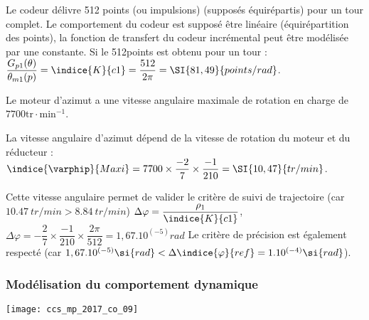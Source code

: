 \ifprof
\begin{corrige}
Le codeur délivre 512 points (ou impulsions) (supposés équirépartis) pour un tour complet. Le comportement du codeur est supposé être linéaire (équirépartition des points), la fonction de transfert du codeur incrémental peut être modélisée par une constante. Si le 512\ieme  points est obtenu pour un tour :
$\dfrac{G_{p1}  (\theta)}{\theta_{m1}  (p)}=\indice{K}{c1} =\dfrac{512}{2\pi} =\SI{81,49}{points/rad}$. 

\end{corrige}
\else
\fi

Le moteur d'azimut a une vitesse angulaire maximale de rotation en charge de $7700 \mathrm{tr} \cdot \mathrm{min}^{-1}$.\\

\ifprof
\begin{corrige}
La vitesse angulaire d’azimut dépend de la vitesse de rotation du moteur et du réducteur : 
$\indice{\varphip}{Maxi} = 7 700 \times \dfrac{-2}{7}\times \dfrac{-1}{210} =\SI{10,47}{tr/min}$.

Cette vitesse angulaire permet de valider le critère de suivi de trajectoire (car $\SI{10,47}{tr/min}>\SI{8,84}{tr/min}$)
$\Delta\varphi= \dfrac{\rho_1}{\indice{K}{c1}}$, $\Delta\varphi= -\dfrac{2}{7}\times \dfrac{-1}{210}\times\dfrac{2  \pi}{512}=1,67.10^{(-5)}\si{rad}$  
Le critère de précision est également respecté (car $1,67.10^{(-5)}\si{rad} <\Delta\indice{\varphi}{ref}=1.10^{(-4)} \si{rad}$).

\end{corrige}
\else
\fi


\subsubsection{Modélisation du comportement dynamique}

\ifprof
\begin{corrige}
\begin{center}

\texttt{[image: ccs\_mp\_2017\_co\_09]}

\end{center}
\end{corrige}
\else
\fi


